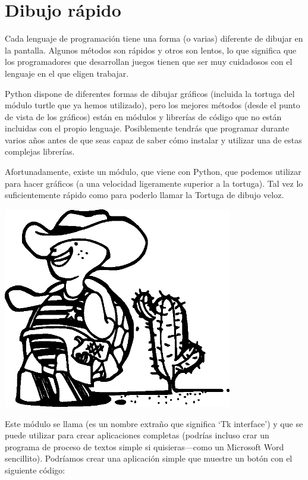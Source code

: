 \section{Dibujo rápido}

Cada lenguaje de programación tiene una forma (o varias) diferente de dibujar en la pantalla. Algunos métodos son rápidos y otros son lentos, lo que significa que los programadores que desarrollan juegos tienen que ser muy cuidadosos con el lenguaje en el que eligen trabajar.
\par
Python dispone de diferentes formas de dibujar gráficos (incluida la tortuga del módulo turtle que ya hemos utilizado), pero los mejores métodos (desde el punto de vista de los gráficos) están en módulos y librerías de código que no están incluidas con el propio lenguaje.  Posiblemente tendrás que programar durante varios años antes de que seas capaz de saber cómo instalar y utilizar una de estas complejas librerías.

Afortunadamente, existe un módulo, que viene con Python, que podemos utilizar para hacer gráficos (a una velocidad ligeramente superior a la tortuga). Tal vez lo suficientemente rápido como para poderlo llamar la Tortuga de dibujo veloz. 


\begin{center}
\includegraphics*[width=100mm]{turtle2.eps}
\end{center}

Este módulo se llama  (es un nombre extraño que significa `Tk interface') y que se puede utilizar para crear aplicaciones completas (podrías incluso crar un programa de proceso de textos simple si quisieras---como un Microsoft Word sencillito). Podríamos crear una aplicación simple que muestre un botón con el siguiente código:

